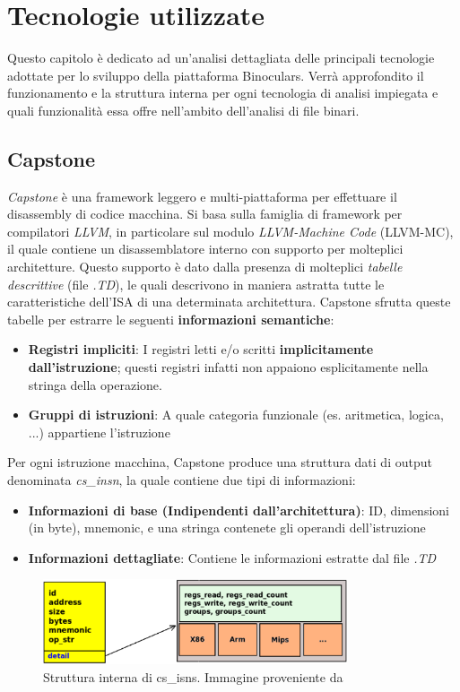 \documentclass[../main.tex]{subfiles}
\begin{document}
\chapter{Tecnologie utilizzate}
\label{chap:conclusion}
Questo capitolo è dedicato ad un'analisi dettagliata delle principali tecnologie adottate per lo sviluppo della piattaforma Binoculars.
Verrà approfondito il funzionamento e la struttura interna per ogni tecnologia di analisi impiegata e quali funzionalità essa offre nell'ambito dell'analisi di
file binari. 
\section{Capstone}
\textit{Capstone} \cite{Capstone_docs} è una framework leggero e multi-piattaforma per effettuare il disassembly di codice macchina.
Si basa sulla famiglia di framework per compilatori \textit{LLVM}, in particolare sul modulo \textit{LLVM-Machine Code} (LLVM-MC), il quale contiene un disassemblatore interno con supporto
per molteplici architetture. Questo supporto è dato dalla presenza di molteplici \textit{tabelle descrittive} (file \textit{.TD}), le quali descrivono in maniera astratta tutte le caratteristiche
dell'ISA di una determinata architettura. 
Capstone sfrutta queste tabelle per estrarre le seguenti \textbf{informazioni semantiche}:
\begin{itemize}
    \item \textbf{Registri impliciti}: I registri letti e/o scritti \textbf{implicitamente dall'istruzione}; questi registri infatti non appaiono esplicitamente nella stringa della operazione.
    \item \textbf{Gruppi di istruzioni}: A quale categoria funzionale (es. aritmetica, logica, ...) appartiene l'istruzione
\end{itemize}
Per ogni istruzione macchina, Capstone produce una struttura dati di output denominata \textit{cs\_insn}, la quale contiene due tipi di informazioni:
\begin{itemize}
    \item \textbf{Informazioni di base (Indipendenti dall'architettura)}: ID, dimensioni (in byte), mnemonic, e una stringa contenete gli operandi dell'istruzione
    \item \textbf{Informazioni dettagliate}: Contiene le informazioni estratte dal file \textit{.TD}
\end{itemize} 
\begin{figure}[H]
    \centering
    \includegraphics[width = 0.80\textwidth]{../images/cs_isns.png}
    \caption{Struttura interna di cs\_isns. Immagine proveniente da \cite{Capstone_docs}}
\end{figure}
\end{document}
